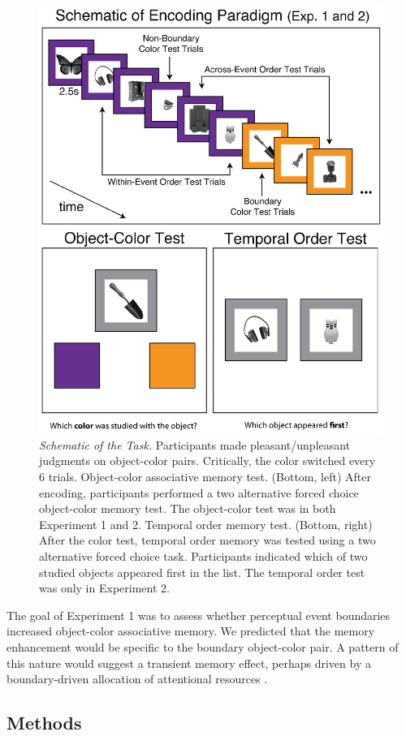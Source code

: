 \begin{figure}
  \centering
  \includegraphics[width=.75\textwidth]{figures/chapter1_figure1.eps}
  \caption[Schematic of the task]{\textit{Schematic of the Task.} Participants made pleasant/unpleasant judgments on object-color pairs.  Critically, the color switched every 6 trials. Object-color associative memory test. (Bottom, left)  After encoding, participants performed a two alternative forced choice object-color memory test. The object-color test was in both Experiment 1 and 2.  Temporal order memory test.  (Bottom, right) After the color test, temporal order memory was tested using a two alternative forced choice task.  Participants indicated which of two studied objects appeared first in the list. The temporal order test was only in Experiment 2.}
  \label{chapter1_figure1}
\end{figure}

The goal of Experiment 1 was to assess whether perceptual event
boundaries increased object-color associative memory. We predicted that
the memory enhancement would be specific to the boundary object-color
pair. A pattern of this nature would suggest a transient memory effect,
perhaps driven by a boundary-driven allocation of attentional resources
\autocite{kurby_segmentation_2008}.

\subsection{Methods}\label{methods}

